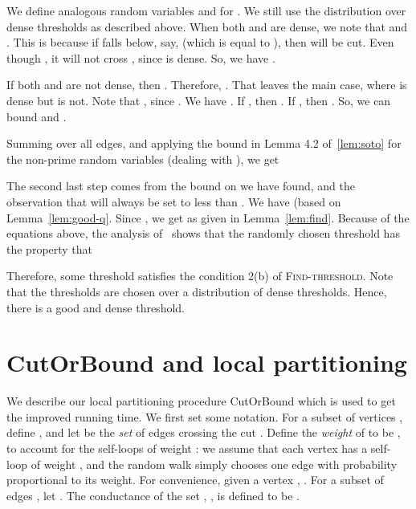 \documentclass[11pt]{article}
\newenvironment{myproof}{\noindent {\sc Proof:}}{}
\newcommand\Find{\textsc{Find-threshold}\xspace}
\newcommand\CutOrBound{{\sc CutOrBound}\xspace}
\begin{document}
\begin{myproof}
\begin{myproof}
We define analogous random variables  and  for .
We still use the distribution over dense thresholds
as described above. When both  and  are dense,
we note that  and .
This is because if  falls below, say,  (which is equal to
), then  will be cut. Even though ,
it will not cross , since  is dense.
So, we have .

If both  and  are not dense, then .
Therefore, .
That leaves the main case, where  is dense but  is not.
Note that , since .
We have .
If , then
.
If , then
.
So, we can bound 
and .

Summing over all edges, and applying the bound in Lemma 4.2 of~\ref{lem:soto}
for the non-prime random variables (dealing with ), we get

The second last step comes from the bound on  we have found,
and the observation that  will always be set to less than .
We have  (based on Lemma~\ref{lem:good-q}.
Since , we get  as given
in Lemma~\ref{lem:find}. Because of the equations above, the analysis
of~\cite{Sot09} shows that the randomly chosen threshold 
has the property that

Therefore, some threshold satisfies the condition 2(b) of {\Find}.
Note that the thresholds are chosen over a distribution of dense
thresholds. Hence, there is a good and dense threshold.
\end{myproof}

\end{myproof}





\section{\CutOrBound and local partitioning}
\def\ptil{\tilde{p}}
\def\Itil{\tilde{I}}
\def\Stil{\tilde{S}}
We describe our local partitioning procedure
{\CutOrBound} which is used to get the improved
running time. We first set some notation.
For a subset of vertices , define , and let  be the \emph{set} of edges crossing the cut . Define the {\em weight} of  to be , to account for the self-loops of weight : we assume that each vertex has a self-loop of weight
, and the random walk simply chooses one edge with probability
proportional to its weight. For convenience, given a vertex , .
For a subset of edges , let . The conductance of the set
, , is defined to be
.
\end{document}
